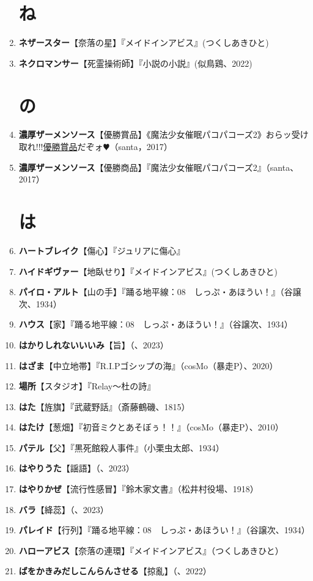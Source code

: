 \documentclass[twocolumn]{jsbook}
\newcommand{\ccite}[1]{《#1》}
\begin{document}
\begin{enumerate}
\section*{ね}
    \item \textbf{ネザースター}【奈落の星】『メイドインアビス』(つくしあきひと)
    \item \textbf{ネクロマンサー}【死霊操術師】『小説の小説』(似鳥鶏、2022)
\section*{の}
    \item \textbf{濃厚ザーメンソース}【優勝賞品】\ccite{魔法少女催眠パコパコーズ2}{おらッ受け取れ!!!\uline{優勝賞品}だぞォ$\varheartsuit$}（santa，2017）
    \item \textbf{濃厚ザーメンソース}【優勝商品】『魔法少女催眠パコパコーズ2』（santa、2017）
\section*{は}
    \item \textbf{ハートブレイク}【傷心】『ジュリアに傷心』
    \item \textbf{ハイドギヴァー}【地臥せり】『メイドインアビス』(つくしあきひと)
    \item \textbf{パイロ・アルト}【山の手】『踊る地平線：08　しっぷ・あほうい！』（谷譲次、1934）
    \item \textbf{ハウス}【家】『踊る地平線：08　しっぷ・あほうい！』（谷譲次、1934）
    \item \textbf{はかりしれないいいみ}【旨】（、2023）
    \item \textbf{はざま}【中立地帯】『R.I.Pゴシップの海』（cosMo（暴走P）、2020）
    \item \textbf{場所}【スタジオ】『Relay〜杜の詩』
    \item \textbf{はた}【旌旗】『武蔵野話』（斎藤鶴磯、1815）
    \item \textbf{はたけ}【葱畑】『初音ミクとあそぼぅ！！』（cosMo（暴走P）、2010）
    \item \textbf{パテル}【父】『黒死館殺人事件』（小栗虫太郎、1934）
    \item \textbf{はやりうた}【謡語】（、2023）
    \item \textbf{はやりかぜ}【流行性感冒】『鈴木家文書』（松井村役場、1918）
    \item \textbf{バラ}【絳蕊】（、2023）
    \item \textbf{パレイド}【行列】『踊る地平線：08　しっぷ・あほうい！』（谷譲次、1934）
    \item \textbf{ハローアビス}【奈落の連環】『メイドインアビス』（つくしあきひと）
    \item \textbf{ばをかきみだしこんらんさせる}【掠亂】（、2022）

\end{enumerate}
\end{document}
